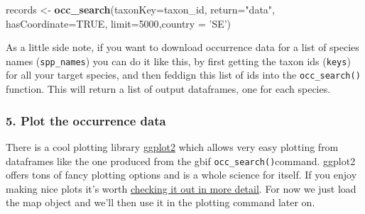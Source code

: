 \documentclass[]{article}
\newenvironment{Shaded}{\begin{snugshade}}{\end{snugshade}}
\newcommand{\CommentTok}[1]{\textcolor[rgb]{0.56,0.35,0.01}{\textit{#1}}}
\newcommand{\ControlFlowTok}[1]{\textcolor[rgb]{0.13,0.29,0.53}{\textbf{#1}}}
\newcommand{\DataTypeTok}[1]{\textcolor[rgb]{0.13,0.29,0.53}{#1}}
\newcommand{\DecValTok}[1]{\textcolor[rgb]{0.00,0.00,0.81}{#1}}
\newcommand{\KeywordTok}[1]{\textcolor[rgb]{0.13,0.29,0.53}{\textbf{#1}}}
\newcommand{\NormalTok}[1]{#1}
\newcommand{\OperatorTok}[1]{\textcolor[rgb]{0.81,0.36,0.00}{\textbf{#1}}}
\newcommand{\OtherTok}[1]{\textcolor[rgb]{0.56,0.35,0.01}{#1}}
\newcommand{\StringTok}[1]{\textcolor[rgb]{0.31,0.60,0.02}{#1}}
\begin{document}
\begin{Shaded}
\begin{Highlighting}[]
\NormalTok{records <-}\StringTok{ }\KeywordTok{occ_search}\NormalTok{(}\DataTypeTok{taxonKey=}\NormalTok{taxon_id, }\DataTypeTok{return=}\StringTok{"data"}\NormalTok{, }\DataTypeTok{hasCoordinate=}\OtherTok{TRUE}\NormalTok{, }\DataTypeTok{limit=}\DecValTok{5000}\NormalTok{,}\DataTypeTok{country =} \StringTok{'SE'}\NormalTok{)}
\end{Highlighting}
\end{Shaded}

As a little side note, if you want to download occurrence data for a
list of species names (\texttt{spp\_names}) you can do it like this, by
first getting the taxon ids (\texttt{keys}) for all your target species,
and then feddign this list of ids into the \texttt{occ\_search()}
function. This will return a list of output dataframes, one for each
species.

\begin{Shaded}
\end{Shaded}

\hypertarget{plot-the-occurrence-data}{%
\subsubsection{5. Plot the occurrence
data}\label{plot-the-occurrence-data}}

There is a cool plotting library
\href{https://ggplot2.tidyverse.org/}{ggplot2} which allows very easy
plotting from dataframes like the one produced from the gbif
\texttt{occ\_search()}command. ggplot2 offers tons of fancy plotting
options and is a whole science for itself. If you enjoy making nice
plots it's worth \href{(https://ggplot2.tidyverse.org/)}{checking it out
in more detail}. For now we just load the map object and we'll then use
it in the plotting command later on.
\end{document}
